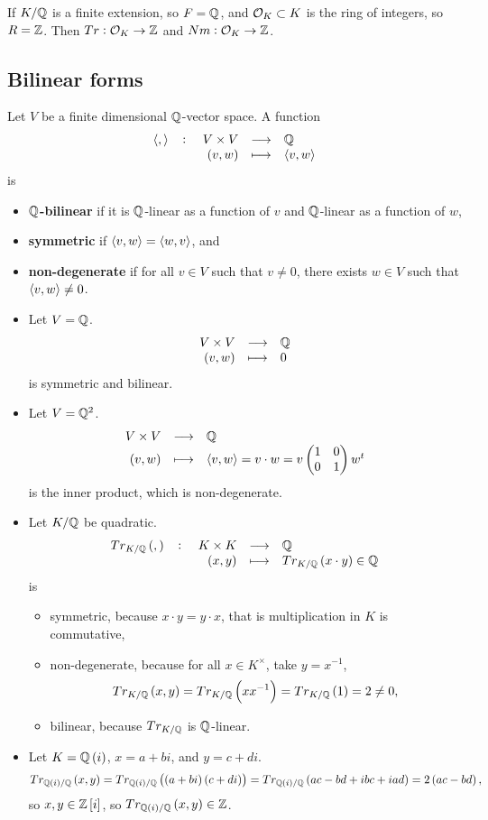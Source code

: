 \begin{corollary}
If $ K / \mathbb{Q} $ is a finite extension, so $ F = \mathbb{Q} $, and $ \mathcal{O}_K \subset K $ is the ring of integers, so $ R = \mathbb{Z} $. Then $ Tr : \mathcal{O}_K \to \mathbb{Z} $ and $ Nm : \mathcal{O}_K \to \mathbb{Z} $.
\end{corollary}

\pagebreak

\subsection{Bilinear forms}

\begin{definition}
Let $ V $ be a finite dimensional $ \mathbb{Q} $-vector space. A function
$$ \function[\abr{,}]{V \times V}{\Q}{\br{v, w}}{\abr{v, w}} $$
is
\begin{itemize}
\item \textbf{$ \mathbb{Q} $-bilinear} if it is $ \mathbb{Q} $-linear as a function of $ v $ and $ \mathbb{Q} $-linear as a function of $ w $,
\item \textbf{symmetric} if $ \left\langle v, w \right\rangle = \left\langle w, v \right\rangle $, and
\item \textbf{non-degenerate} if for all $ v \in V $ such that $ v \ne 0 $, there exists $ w \in V $ such that $ \left\langle v, w \right\rangle \ne 0 $.
\end{itemize}
\end{definition}

\begin{example*}
\hfill
\begin{itemize}
\item Let $ V = \mathbb{Q} $.
$$ \function{V \times V}{\Q}{\br{v, w}}{0} $$
is symmetric and bilinear.
\item Let $ V = \mathbb{Q}^2 $.
$$ \function{V \times V}{\Q}{\br{v, w}}{\abr{v, w} = v \cdot w = v\twobytwo{1}{0}{0}{1}w^t} $$
is the inner product, which is non-degenerate.
\item Let $ K / \mathbb{Q} $ be quadratic.
$$ \function[Tr_{K / \Q}\br{,}]{K \times K}{\Q}{\br{x, y}}{Tr_{K / \Q}\br{x \cdot y} \in \Q} $$
is
\begin{itemize}
\item symmetric, because $ x \cdot y = y \cdot x $, that is multiplication in $ K $ is commutative,
\item non-degenerate, because for all $ x \in K^\times $, take $ y = x^{-1} $,
$$ Tr_{K / \Q}\br{x, y} = Tr_{K / \Q}\br{xx^{-1}} = Tr_{K / \Q}\br{1} = 2 \ne 0, $$
\item bilinear, because $ Tr_{K / \mathbb{Q}} $ is $ \mathbb{Q} $-linear.
\end{itemize}
\item Let $ K = \Q\br{i} $, $ x = a + bi $, and $ y = c + di $.
$$ Tr_{\Q\br{i} / \Q}\br{x, y} = Tr_{\Q\br{i} / \Q}\br{\br{a + bi}\br{c + di}} = Tr_{\Q\br{i} / \Q}\br{ac - bd + ibc + iad} = 2\br{ac - bd}, $$
so $ x, y \in \Z\sbr{i} $, so $ Tr_{\Q\br{i} / \Q}\br{x, y} \in \Z $.
\end{itemize}
\end{example*}

